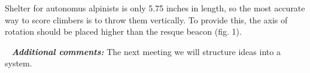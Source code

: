 \begin{enumerate*}
  	\item Shelter for autonomus alpinists is only 5.75 inches in length, so the most accurate way to score climbers is to throw them vertically. To provide this, the axis of rotation should be placed higher than the resque beacon (fig. 1).
  	\begin{figure}[H]
  		\begin{minipage}[h]{1\linewidth}
  			\caption{}
  		\end{minipage}
  	\end{figure}
  	
  \end{enumerate*}
  
   \newline
  \textit{\textbf{Additional comments:}} The next meeting we will structure ideas into a system.
  
\fillpage
